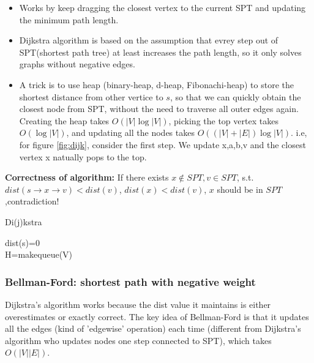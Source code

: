 \begin{itemize}
    \item Works by keep dragging the closest vertex to the current SPT and updating the minimum path length. 
    \item Dijkstra algorithm is based on the assumption that evrey step out of SPT(shortest path tree) at least increases the path length, so it only solves graphs without negative edges.
    \item A trick is to use heap (binary-heap, d-heap, Fibonachi-heap) to store the shortest distance from other vertice to $s$, so that we can quickly obtain the closest node from SPT, without the need to traverse all outer edges again. 
    Creating the heap takes $O(|V|\log |V|)$, picking the top vertex takes $O(\log |V|)$, and updating all the nodes takes $O((|V|+|E|)\log |V|)$.
    i.e, for figure \ref{fig:dijk},  consider the first step. We update {x,a,b,v} and the closest vertex x natually pops to the top.
\end{itemize}
\textbf{Correctness of algorithm:}
If there exists $x \notin SPT, v \in SPT$, s.t. $dist(s\rightarrow x \rightarrow v)<dist(v)$, $dist(x)<dist(v)$, $x$ should be in $SPT$,contradiction! 
\begin{algorithm}
\caption{Di(j)kstra}
\label{fig:dijk}

dist(s)=0\\
H=makequeue(V)\\
\end{algorithm}

\subsubsection{Bellman-Ford: shortest path with negative weight}
Dijkstra's algorithm works because the dist value it maintains is either overestimates or exactly correct.
The key idea of Bellman-Ford is that it updates all the edges (kind of 'edgewise' operation) each time (different from Dijkstra's algorithm who updates nodes one step connected to SPT), which takes $O(|V||E|)$.

